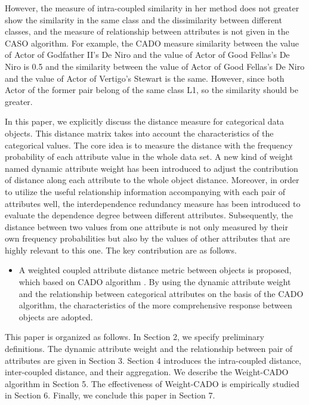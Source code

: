 \documentclass[review]{elsarticle}
\begin{document}
However, the measure of intra-coupled similarity in her method does not greater show the similarity in the same class and the dissimilarity between different classes, and the measure of relationship between attributes is not given in the CASO algorithm. For example, the CADO measure similarity between the value of Actor of Godfather II's De Niro and the value of Actor of Good Fellas's De Niro is 0.5 and the similarity between the value of Actor of Good Fellas's De Niro and the value of Actor of Vertigo's Stewart is the same. However, since both Actor of the former pair belong of the same class L1, so the similarity should be greater.

In this paper, we explicitly discuss the distance measure for categorical data objects. This distance matrix takes into account the characteristics of the categorical values. The core idea is to measure the distance with the frequency probability of each attribute value in the whole data set. A new kind of weight named dynamic attribute weight \cite{JiaH2016NewMetric} has been introduced to adjust the contribution of distance along each attribute to the whole object distance. Moreover, in order to utilize the useful relationship information accompanying with each pair of attributes well, the interdependence redundancy measure \cite{WaiHoAu2005Grouping} has been introduced to evaluate the dependence degree between different attributes. Subsequently, the distance between two values from one attribute is not only measured by their own frequency probabilities but also by the values of other attributes that are highly relevant to this one. The key contribution are as follows.

\begin{itemize}
  \item A weighted coupled attribute distance metric between objects is proposed, which based on CADO algorithm \cite{WangC2015CADO}. By using the dynamic attribute weight and the relationship between categorical attributes \cite{JiaH2016NewMetric} on the basis of the CADO algorithm, the characteristics of the more comprehensive response between objects are adopted.
\end{itemize}

This paper is organized as follows. In Section 2, we specify preliminary definitions. The dynamic attribute weight and the relationship between pair of attributes are given in Section 3. Section 4 introduces the intra-coupled distance, inter-coupled distance, and their aggregation. We describe the Weight-CADO algorithm in Section 5. The effectiveness of Weight-CADO is empirically studied in Section 6. Finally, we conclude this paper in Section 7.
\end{document}
